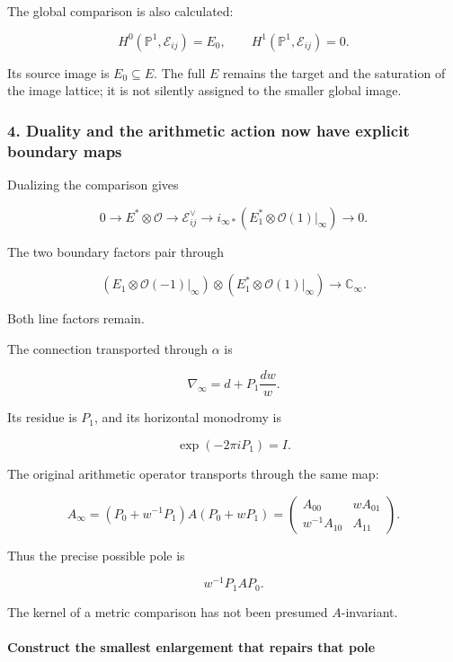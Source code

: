 The global comparison is also calculated:

\[
\boxed{
H^0(\mathbb P^1,\mathscr E_{ij})=E_0,
\qquad
H^1(\mathbb P^1,\mathscr E_{ij})=0.
}
\]

Its source image is \(E_0\subseteq E\). The full \(E\) remains the target and the saturation of the image lattice; it is not silently assigned to the smaller global image.

\subsubsection{4. Duality and the arithmetic action now have explicit boundary maps}\label{endpoint-curvature_original--duality-and-the-arithmetic-action-now-have-explicit-boundary-maps}

Dualizing the comparison gives

\[
\boxed{
0\to E^*\otimes\mathcal O
\to\mathscr E_{ij}^{\vee}
\to
i_{\infty*}\!\left(E_1^*\otimes\mathcal O(1)|_\infty\right)
\to0.
}
\]

The two boundary factors pair through

\[
\boxed{
(E_1\otimes\mathcal O(-1)|_\infty)
\otimes
(E_1^*\otimes\mathcal O(1)|_\infty)
\longrightarrow\mathbb C_\infty.
}
\]

Both line factors remain.

The connection transported through \(\alpha\) is

\[
\nabla_\infty=d+P_1\frac{dw}{w}.
\]

Its residue is \(P_1\), and its horizontal monodromy is

\[
\exp(-2\pi iP_1)=I.
\]

The original arithmetic operator transports through the same map:

\[
\boxed{
\widehat A_\infty
=
(P_0+w^{-1}P_1)A(P_0+wP_1)
=
\begin{pmatrix}
A_{00}&wA_{01}\\
w^{-1}A_{10}&A_{11}
\end{pmatrix}.
}
\]

Thus the precise possible pole is

\[
w^{-1}P_1AP_0.
\]

The kernel of a metric comparison has not been presumed \(A\)-invariant.

\paragraph{Construct the smallest enlargement that repairs that pole}\label{endpoint-curvature_original--construct-the-smallest-enlargement-that-repairs-that-pole}

